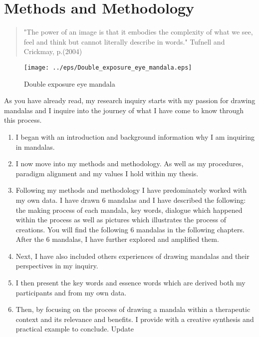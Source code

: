 \newpage
\chapter{Methods and Methodology}
\begin{quote}
"The power of an image is that it embodies the complexity of what we see, feel and think but cannot literally describe in words." Tufnell and Crickmay, p.(2004)
\end{quote}

\newpage

\begin{figure}[htbp]
\begin{center}
\texttt{[image: ../eps/Double\_exposure\_eye\_mandala.eps]}
\caption{Double exposure eye mandala}
\label{label}
\end{center}
\end{figure}

\newpage

As you have already read, my research inquiry starts with my passion for drawing mandalas and I inquire into the journey of what I have come to know through this process. 
\begin{enumerate}
\item I began with an introduction and background information why I am inquiring in mandalas.  
\item I now move into my methods and methodology. As well as my procedures, paradigm alignment and my values I hold within my thesis. 
\item 
Following my methods and methodology I have predominately worked with my own data. I have drawn 6 mandalas and I have described the following: the making process of each mandala, key words, dialogue which happened within the process as well as pictures which illustrates the process of creations. You will find the following 6 mandalas in the following chapters. After the 6 mandalas, I have further explored and amplified them. 
\item 
Next, I have also included others experiences of drawing mandalas and their perspectives in my inquiry.
\item 
I then present the key words and essence words which are derived both my participants and from my own data. 
\item 
Then, by focusing on the process of drawing a mandala within a therapeutic context and its relevance and benefits. I provide with a creative synthesis and practical example to conclude.
Update 
\end{enumerate}

